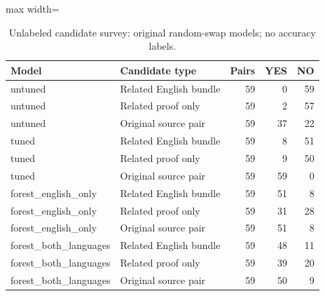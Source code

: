 \begin{table}[htbp]
\centering
\caption{Unlabeled candidate survey: original random-swap models; no accuracy labels.}
\label{tab:related-candidates}
\small
\begin{adjustbox}{max width=\textwidth}
\begin{tabular}{llrrr}
\toprule
Model & Candidate type & Pairs & YES & NO \\
\midrule
untuned & Related English bundle & 59 & 0 & 59 \\
untuned & Related proof only & 59 & 2 & 57 \\
untuned & Original source pair & 59 & 37 & 22 \\
tuned & Related English bundle & 59 & 8 & 51 \\
tuned & Related proof only & 59 & 9 & 50 \\
tuned & Original source pair & 59 & 59 & 0 \\
forest\_english\_only & Related English bundle & 59 & 51 & 8 \\
forest\_english\_only & Related proof only & 59 & 31 & 28 \\
forest\_english\_only & Original source pair & 59 & 51 & 8 \\
forest\_both\_languages & Related English bundle & 59 & 48 & 11 \\
forest\_both\_languages & Related proof only & 59 & 39 & 20 \\
forest\_both\_languages & Original source pair & 59 & 50 & 9 \\
\bottomrule
\end{tabular}
\end{adjustbox}
\end{table}
